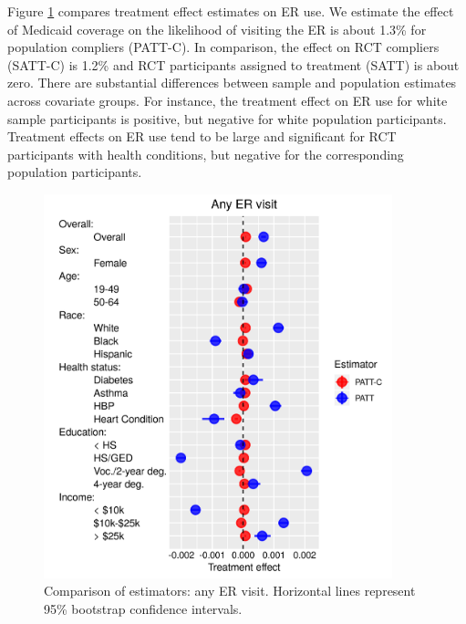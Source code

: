 \documentclass[hidelinks,12pt]{article}
\begin{document}
{Figure \ref{fig:any-visit-plot} compares treatment effect estimates on ER use. We estimate the effect of Medicaid coverage on the likelihood of visiting the ER is about 1.3\% for population compliers (PATT-C). In comparison, the effect on RCT compliers (SATT-C) is 1.2\% and RCT participants assigned to treatment (SATT) is about zero. There are substantial differences between sample and population estimates across covariate groups. For instance, the treatment effect on ER use for white sample participants is positive, but negative for white population participants. Treatment effects on ER use tend to be large and significant for RCT participants with health conditions, but negative for the corresponding population participants.
%

\begin{figure}[htbp]
\begin{center}
\includegraphics[width = 0.9\textwidth]{any-visit-plot}
    \caption{Comparison of estimators: any ER visit. Horizontal lines represent 95\% bootstrap confidence intervals.\label{fig:any-visit-plot}}
\end{center}
\end{figure}

}
\end{document}
